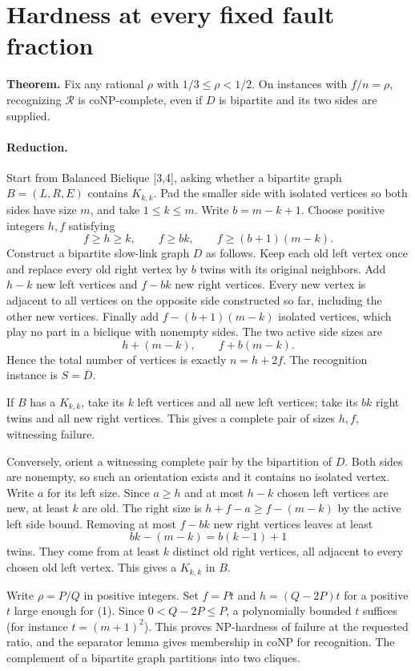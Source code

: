 \documentclass[11pt]{article}
\begin{document}
\section{Hardness at every fixed fault fraction}
\textbf{Theorem.} Fix any rational $\rho$ with $1/3\le\rho<1/2$. On instances with $f/n=\rho$, recognizing $\mathcal R$ is coNP-complete, even if $D$ is bipartite and its two sides are supplied.

\paragraph{Reduction.}
Start from Balanced Biclique [3,4], asking whether a bipartite graph $B=(L,R,E)$ contains $K_{k,k}$. Pad the smaller side with isolated vertices so both sides have size $m$, and take $1\le k\le m$. Write $b=m-k+1$. Choose positive integers $h,f$ satisfying
\[
 f\ge h\ge k,\qquad f\ge bk,\qquad f\ge (b+1)(m-k).
 \tag{1}
\]
Construct a bipartite slow-link graph $D$ as follows. Keep each old left vertex once and replace every old right vertex by $b$ twins with its original neighbors. Add $h-k$ new left vertices and $f-bk$ new right vertices. Every new vertex is adjacent to all vertices on the opposite side constructed so far, including the other new vertices. Finally add $f-(b+1)(m-k)$ isolated vertices, which play no part in a biclique with nonempty sides. The two active side sizes are
\[
 h+(m-k),\qquad f+b(m-k).
\]
Hence the total number of vertices is exactly $n=h+2f$. The recognition instance is $S=\overline D$.

If $B$ has a $K_{k,k}$, take its $k$ left vertices and all new left vertices; take its $bk$ right twins and all new right vertices. This gives a complete pair of sizes $h,f$, witnessing failure.

Conversely, orient a witnessing complete pair by the bipartition of $D$. Both sides are nonempty, so such an orientation exists and it contains no isolated vertex. Write $a$ for its left size. Since $a\ge h$ and at most $h-k$ chosen left vertices are new, at least $k$ are old. The right size is $h+f-a\ge f-(m-k)$ by the active left side bound. Removing at most $f-bk$ new right vertices leaves at least
\[
 bk-(m-k)=b(k-1)+1
\]
twins. They come from at least $k$ distinct old right vertices, all adjacent to every chosen old left vertex. This gives a $K_{k,k}$ in $B$.

Write $\rho=P/Q$ in positive integers. Set $f=Pt$ and $h=(Q-2P)t$ for a positive $t$ large enough for (1). Since $0<Q-2P\le P$, a polynomially bounded $t$ suffices (for instance $t=(m+1)^2$). This proves NP-hardness of failure at the requested ratio, and the separator lemma gives membership in coNP for recognition. The complement of a bipartite graph partitions into two cliques.
\end{document}
